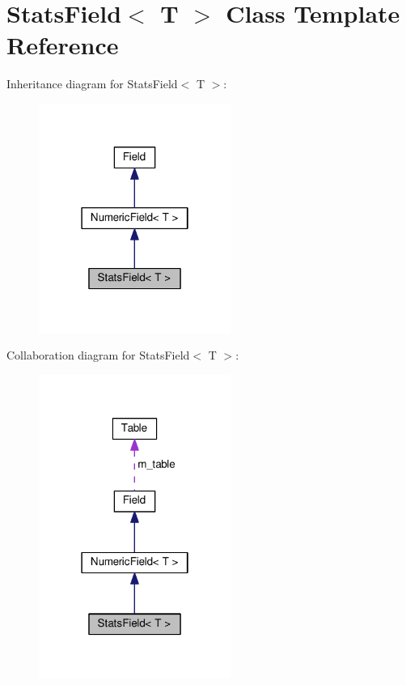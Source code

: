 \hypertarget{classStatsField}{}\section{Stats\+Field$<$ T $>$ Class Template Reference}
\label{classStatsField}


Inheritance diagram for Stats\+Field$<$ T $>$\+:
\nopagebreak
\begin{figure}[H]
\begin{center}
\leavevmode
\includegraphics[width=178pt]{classStatsField__inherit__graph}
\end{center}
\end{figure}


Collaboration diagram for Stats\+Field$<$ T $>$\+:
\nopagebreak
\begin{figure}[H]
\begin{center}
\leavevmode
\includegraphics[width=178pt]{classStatsField__coll__graph}
\end{center}
\end{figure}

